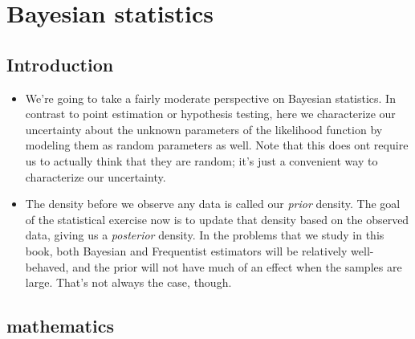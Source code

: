 

\chapter{Bayesian statistics}

\section{Introduction}

\begin{itemize}[leftmargin=0pt]

\item We're going to take a fairly moderate perspective on Bayesian
  statistics.  In contrast to point estimation or hypothesis testing,
  here we characterize our uncertainty about the unknown parameters of
  the likelihood function by modeling them as random parameters as
  well.  Note that this does ont require us to actually think that
  they are random; it's just a convenient way to characterize our
  uncertainty.

\item The density before we observe any data is called our
  \emph{prior} density.  The goal of the statistical exercise now is
  to update that density based on the observed data, giving us a
  \emph{posterior} density.  In the problems that we study in this
  book, both Bayesian and Frequentist estimators will be relatively
  well-behaved, and the prior will not have much of an effect when the
  samples are large.  That's not always the case, though.

\end{itemize}

\section{mathematics}


